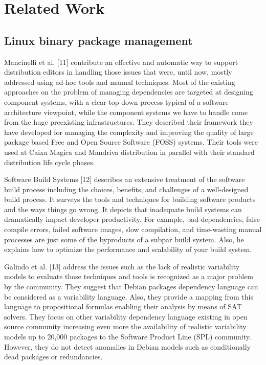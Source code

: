 \section{Related Work}

\subsection{Linux binary package management}

Mancinelli et al. [11] contribute an effective and automatic way to support distribution editors in handling those issues that were, until now, mostly addressed using ad-hoc tools and manual techniques. Most of  the existing approaches on the problem of managing dependencies are targeted at designing component systems, with a clear top-down process typical of a software architecture viewpoint, while the component systems we have to handle come from the huge preexisting infrastructures. They described their framework they have developed for managing the complexity and improving the quality of large package based Free and Open Source Software (FOSS) systems. Their tools were used at Caixa Magica and Mandriva distribution in parallel with their standard distribution life cycle phases.


Software Build Systems [12] describes an extensive treatment of the software build process including the choices, benefits, and challenges of a well-designed build process. It surveys the tools and techniques for building software products and the ways things go wrong. It depicts that inadequate build systems can dramatically impact developer productivity. For example, bad dependencies, false compile errors, failed software images, slow compilation, and time-wasting manual processes are just some of the byproducts of a subpar build system. Also, he explains how to optimize the performance and scalability of your build system. 


Galindo et al. [13] address the issues such as the lack of realistic variability models to evaluate those techniques and tools is recognized as a major problem by the community. They suggest that Debian packages dependency language can be considered as a variability language. Also, they provide a mapping from this language to propositional formulas enabling their analysis by means of SAT solvers. They focus on other variability dependency language existing in open source community increasing even more the availability of realistic variability models up to 20,000 packages to the Software Product Line (SPL) community. However, they do not detect anomalies in Debian models such as conditionally dead packages or redundancies.


